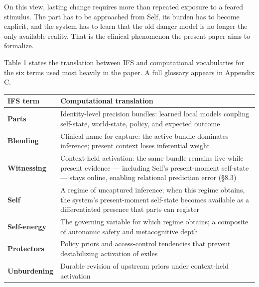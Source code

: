 \documentclass[12pt,a4paper]{article}
\newcounter{none}
\begin{document}
On this view, lasting change requires more than repeated exposure to a
feared stimulus. The part has to be approached from Self, its burden has
to become explicit, and the system has to learn that the old danger
model is no longer the only available reality. That is the clinical
phenomenon the present paper aims to formalize.

Table 1 states the translation between IFS and computational
vocabularies for the six terms used most heavily in the paper. A full
glossary appears in Appendix C.

{\def\LTcaptype{none} %
\begin{longtable}[]{@{}
  >{\raggedright\arraybackslash}p{}
  >{\raggedright\arraybackslash}p{}@{}}
\toprule\noalign{}
\begin{minipage}[b]{\linewidth}\raggedright
IFS term
\end{minipage} & \begin{minipage}[b]{\linewidth}\raggedright
Computational translation
\end{minipage} \\
\midrule\noalign{}
\endhead
\bottomrule\noalign{}
\endlastfoot
\textbf{Parts} & Identity-level precision bundles: learned local models
coupling self-state, world-state, policy, and expected outcome \\
\textbf{Blending} & Clinical name for capture: the active bundle
dominates inference; present context loses inferential weight \\
\textbf{Witnessing} & Context-held activation: the same bundle remains
live while present evidence --- including Self's present-moment
self-state --- stays online, enabling relational prediction error
(§8.3) \\
\textbf{Self} & A regime of uncaptured inference; when this regime
obtains, the system's present-moment self-state becomes available as a
differentiated presence that parts can register \\
\textbf{Self-energy} & The governing variable for which regime obtains;
a composite of autonomic safety and metacognitive depth \\
\textbf{Protectors} & Policy priors and access-control tendencies that
prevent destabilizing activation of exiles \\
\textbf{Unburdening} & Durable revision of upstream priors under
context-held activation \\
\end{longtable}
}
\end{document}
